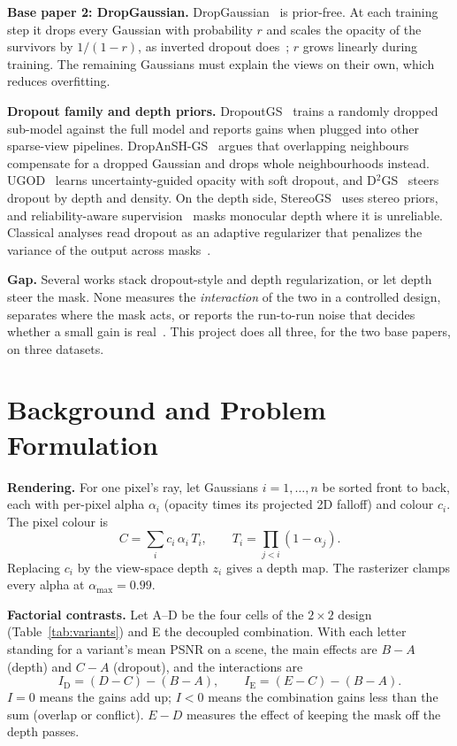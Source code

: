 \documentclass[conference]{IEEEtran}
\newcommand{\ID}{I_{\mathrm{D}}}
\newcommand{\IE}{I_{\mathrm{E}}}
\begin{document}
\textbf{Base paper 2: DropGaussian.} DropGaussian~\cite{park2025dropgaussian} is prior-free. At each training step it drops every Gaussian with probability $r$ and scales the opacity of the survivors by $1/(1-r)$, as inverted dropout does~\cite{srivastava2014dropout}; $r$ grows linearly during training. The remaining Gaussians must explain the views on their own, which reduces overfitting.

\textbf{Dropout family and depth priors.} DropoutGS~\cite{xu2025dropoutgs} trains a randomly dropped sub-model against the full model and reports gains when plugged into other sparse-view pipelines. DropAnSH-GS~\cite{fang2026dropansh} argues that overlapping neighbours compensate for a dropped Gaussian and drops whole neighbourhoods instead. UGOD~\cite{guo2025ugod} learns uncertainty-guided opacity with soft dropout, and D$^2$GS~\cite{song2025d2gs} steers dropout by depth and density. On the depth side, StereoGS~\cite{yuan2026stereogs} uses stereo priors, and reliability-aware supervision~\cite{chu2026reliability} masks monocular depth where it is unreliable. Classical analyses read dropout as an adaptive regularizer that penalizes the variance of the output across masks~\cite{wager2013dropout}.

\textbf{Gap.} Several works stack dropout-style and depth regularization, or let depth steer the mask. None measures the \emph{interaction} of the two in a controlled design, separates where the mask acts, or reports the run-to-run noise that decides whether a small gain is real~\cite{bouthillier2021variance}. This project does all three, for the two base papers, on three datasets.

\section{Background and Problem Formulation}\label{sec:background}
\textbf{Rendering.} For one pixel's ray, let Gaussians $i=1,\dots,n$ be sorted front to back, each with per-pixel alpha $\alpha_i$ (opacity times its projected 2D falloff) and colour $c_i$. The pixel colour is
\begin{equation}
C=\sum_{i} c_i\,\alpha_i\,T_i,\qquad T_i=\prod_{j<i}(1-\alpha_j).
\label{eq:composite}
\end{equation}
Replacing $c_i$ by the view-space depth $z_i$ gives a depth map. The rasterizer clamps every alpha at $\alpha_{\max}=0.99$.

\textbf{Factorial contrasts.} Let A--D be the four cells of the $2\times2$ design (Table~\ref{tab:variants}) and E the decoupled combination. With each letter standing for a variant's mean PSNR on a scene, the main effects are $B-A$ (depth) and $C-A$ (dropout), and the interactions are
\begin{equation}
\ID=(D-C)-(B-A),\qquad \IE=(E-C)-(B-A).
\end{equation}
$I=0$ means the gains add up; $I<0$ means the combination gains less than the sum (overlap or conflict). $E-D$ measures the effect of keeping the mask off the depth passes.
\end{document}
